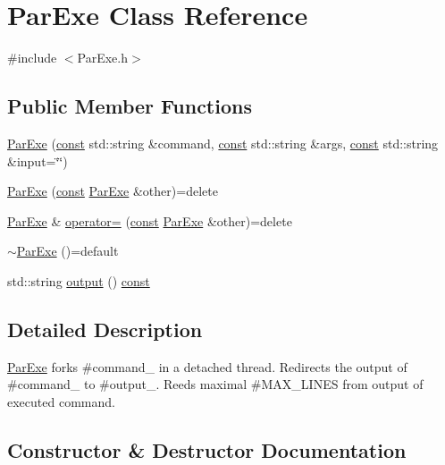 \hypertarget{class_par_exe}{}\section{Par\+Exe Class Reference}
\label{class_par_exe}


{\ttfamily \#include $<$Par\+Exe.\+h$>$}

\subsection*{Public Member Functions}
\begin{DoxyCompactItemize}
\item 
\hyperlink{class_par_exe_a8cc79409b6f5cdb1bd98d595618e245e}{Par\+Exe} (\hyperlink{functions__c_8js_afacfd9c985d225bb07483b887a801b6f}{const} std\+::string \&command, \hyperlink{functions__c_8js_afacfd9c985d225bb07483b887a801b6f}{const} std\+::string \&args, \hyperlink{functions__c_8js_afacfd9c985d225bb07483b887a801b6f}{const} std\+::string \&input=\char`\"{}\char`\"{})
\item 
\hyperlink{class_par_exe_a78f0aa6a835dbb958fc29abd3457d414}{Par\+Exe} (\hyperlink{functions__c_8js_afacfd9c985d225bb07483b887a801b6f}{const} \hyperlink{class_par_exe}{Par\+Exe} \&other)=delete
\item 
\hyperlink{class_par_exe}{Par\+Exe} \& \hyperlink{class_par_exe_a200814420e4d2e6f3128c761789d0f1a}{operator=} (\hyperlink{functions__c_8js_afacfd9c985d225bb07483b887a801b6f}{const} \hyperlink{class_par_exe}{Par\+Exe} \&other)=delete
\item 
\hyperlink{class_par_exe_a6b7cfc33ef1b4afa98ac41a89cff1fd7}{$\sim$\+Par\+Exe} ()=default
\item 
std\+::string \hyperlink{class_par_exe_aa988c933599f973a6641a157331efb1a}{output} () \hyperlink{functions__c_8js_afacfd9c985d225bb07483b887a801b6f}{const} 
\end{DoxyCompactItemize}


\subsection{Detailed Description}
\hyperlink{class_par_exe}{Par\+Exe} forks \#command\+\_\+ in a detached thread. Redirects the output of \#command\+\_\+ to \#output\+\_\+. Reeds maximal \#\+M\+A\+X\+\_\+\+L\+I\+N\+ES from output of executed command. 

\subsection{Constructor \& Destructor Documentation}
